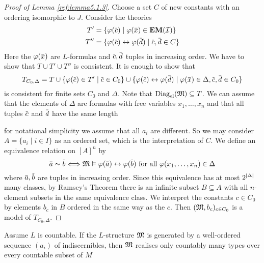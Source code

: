 \documentclass[11pt]{article}
\def \EM {\textbf{EM}}
\begin{document}
\begin{proof}[Proof of Lemma \ref{ref:lemma5.1.3}]
Choose a set \(C\) of new constants with an ordering isomorphic to \(J\). Consider the theories
\begin{align*}
T'&=\{\varphi(\barc)\mid\varphi(\barx)\in\EM(\cali)\}\\
T''&=\{\varphi(\barc)\leftrightarrow\varphi(\bard)\mid\barc,\bard\in C\}
\end{align*}
Here the \(\varphi(\barx)\) are \(L\)-formulas and \(\barc,\bard\) tuples in increasing order. We have
to show that \(T\cup T'\cup T''\) is consistent. It is enough to show that
\begin{equation*}
T_{C_0,\Delta}=T\cup\{\varphi(\barc)\in T'\mid\barc\in C_0\}\cup\{\varphi(\barc)\leftrightarrow\varphi(\bard)\mid\varphi(\barx)\in\Delta,\barc,\bard\in C_0\}
\end{equation*}
is consistent for finite sets \(C_0\) and \(\Delta\). Note that \(\operatorname{Diag}_{\operatorname{el}}(\mathfrak{M})\subseteq T\).
We can assume that the elements of \(\Delta\) are formulas
with free variables \(x_1,\dots,x_n\) and that all tuples \(\barc\) and \(\bard\) have the same
length

for notational simplicity we assume that all \(a_i\) are different. So we may
consider \(A=\{a_i\mid i\in I\}\) as an ordered set, which is the interpretation of \(C\). We define an
equivalence relation on \([A]^n\) by
\begin{equation*}
\bara\sim\barb\Longleftrightarrow\fM\vDash\varphi(\bara)\leftrightarrow\varphi(\barb)\text{ for all }\varphi(x_1,\dots,x_n)\in\Delta
\end{equation*}
where \(\bara,\barb\) are tuples in increasing order. Since this equivalence has at
most \(2^{\abs{\Delta}}\) many classes, by Ramsey's Theorem there is an infinite subset \(B\subseteq A\) with
all \(n\)-element subsets in the same equivalence class. We interpret the constants \(c\in C_0\)
by elements \(b_c\) in \(B\) ordered in the same way as the \(c\). Then \((\mathfrak{M},b_c)_{c\in C_0}\) is
a model of \(T_{C_0,\Delta}\).
\end{proof}

\begin{lemma}[]
\label{lemma5.1.6}
Assume \(L\) is countable. If the \(L\)-structure \(\mathfrak{M}\) is generated by a well-ordered
sequence \((a_i)\) of indiscernibles, then \(\mathfrak{M}\) realises only countably many types over every
countable subset of \(M\)
\end{lemma}
\end{document}

